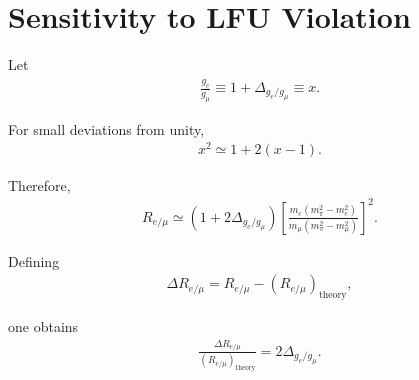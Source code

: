 \section{Sensitivity to LFU Violation}

Let
\begin{align}
\frac{g_e}{g_\mu}
\equiv
1+\Delta_{g_e/g_\mu}
\equiv x .
\end{align}

For small deviations from unity,
\begin{align}
x^2
\simeq
1+2(x-1).
\end{align}

Therefore,
\begin{align}
R_{e/\mu}
\simeq
\left(1+2\Delta_{g_e/g_\mu}\right)
\left[
\frac{
m_e(m_\pi^2-m_e^2)
}{
m_\mu(m_\pi^2-m_\mu^2)
}
\right]^2 .
\end{align}

Defining
\begin{align}
\Delta R_{e/\mu}
=
R_{e/\mu}
-
\left(R_{e/\mu}\right)_{\mathrm{theory}},
\end{align}

one obtains
\begin{align}
\frac{
\Delta R_{e/\mu}
}{
\left(R_{e/\mu}\right)_{\mathrm{theory}}
}
=
2\Delta_{g_e/g_\mu}.
\end{align}
